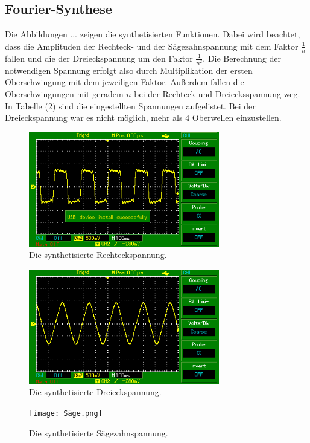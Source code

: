 \subsection{Fourier-Synthese}
Die Abbildungen ... zeigen die synthetisierten Funktionen. Dabei wird beachtet,
dass die Amplituden der Rechteck- und der Sägezahnspannung mit dem Faktor $\frac{1}{n}$ fallen
und die der Dreieckspannung um den Faktor $\frac{1}{n^2}$. Die Berechnung der notwendigen Spannung erfolgt also durch
Multiplikation der ersten Oberschwingung mit dem jeweiligen Faktor.
Außerdem fallen die Oberschwingungen mit geradem $n$
bei der Rechteck und Dreiecksspannung weg. In Tabelle (2) sind die eingestellten Spannungen aufgelistet.
Bei der Dreieckspannung war es nicht möglich, mehr als 4 Oberwellen einzustellen.
\begin{figure}
  \centering
  \includegraphics[height=5cm]{rechteck.png}
  \caption{Die synthetisierte Rechteckspannung.}
  \label{fig:rechteck}
\end{figure}
\begin{figure}
  \centering
  \includegraphics[height=5cm]{Dreieck.png}
  \caption{Die synthetisierte Dreieckspannung.}
  \label{fig:rechteck}
\end{figure}
\begin{figure}
  \centering
  \texttt{[image: Säge.png]}
  \caption{Die synthetisierte Sägezahnspannung.}
  \label{fig:rechteck}
\end{figure}



